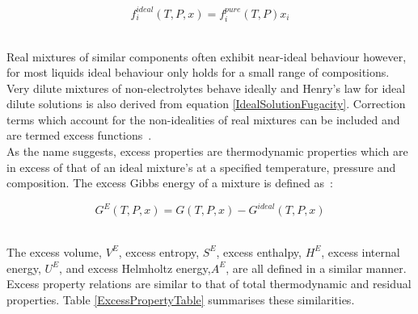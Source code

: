 \begin{equation}
f_{i}^{ideal}\left(T, P, x \right) = f_{i}^{pure} \left(T, P\right) x_{i} \label{LewisRandall}
\end{equation}\


Real mixtures of similar components often exhibit near-ideal behaviour however, for most liquids ideal behaviour only holds for a small range of compositions. Very dilute mixtures of non-electrolytes behave ideally and Henry's law for ideal dilute solutions is also derived from equation \ref{IdealSolutionFugacity}. Correction terms which account for the non-idealities of real mixtures can be included and are termed excess functions~\cite{MolecularThermodynamicsOfFluidPhaseEquilibria, SmithNessAbbott}.\\

As the name suggests, excess properties are thermodynamic properties which are in excess of that of an ideal mixture's at a specified temperature, pressure and composition. The excess Gibbs energy of a mixture is defined as~\cite{MolecularThermodynamicsOfFluidPhaseEquilibria, SmithNessAbbott}:\

\begin{equation}
G^{E}\left(T, P, x\right) = G\left(T, P, x\right) - G^{ideal}\left(T, P, x\right)
\end{equation}\


The excess volume, $V^{E}$, excess entropy, $S^{E}$, excess enthalpy, $H^{E}$, excess internal energy, $U^{E}$, and excess Helmholtz energy,$A^{E}$, are all defined in a similar manner. Excess property relations are similar to that of total thermodynamic and residual properties. Table \ref{ExcessPropertyTable} summarises these similarities.\\

